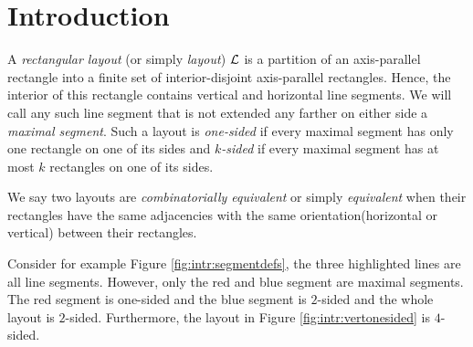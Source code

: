 
\section{Introduction}
\thispagestyle{plain}

  A  \emph{rectangular layout} (or simply \emph{layout}) $\mathcal{L}$ is a partition of an axis-parallel rectangle into a finite set of interior-disjoint axis-parallel rectangles. Hence, the interior of this rectangle contains vertical and horizontal line segments. We will call any such line segment that is not extended any farther on either side a \emph{maximal segment}. Such a layout is \emph{one-sided} if every maximal segment has only one rectangle on one of its sides and \emph{$k$-sided} if every maximal segment has at most $k$ rectangles on one of its sides.

  We say two layouts are  \emph{combinatorially equivalent} or simply \emph{equivalent} when their rectangles have the same adjacencies with the same orientation(horizontal or vertical) between their rectangles.

  Consider for example Figure \ref{fig:intr:segmentdefs}, the three highlighted lines are all line segments. However, only the red and blue segment are maximal segments. The red segment is one-sided and the blue segment is $2$-sided and the whole layout is $2$-sided. Furthermore, the layout in Figure \ref{fig:intr:vertonesided} is $4$-sided.

